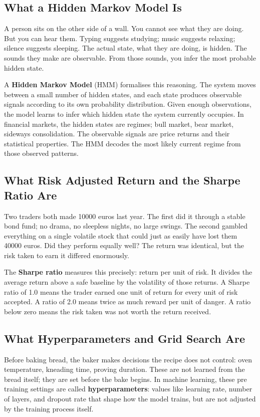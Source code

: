 \documentclass[journal]{IEEEtran}
\begin{document}
\subsection{What a Hidden Markov Model Is}

A person sits on the other side of a wall. You cannot see what they are
doing. But you can hear them. Typing suggests studying; music suggests
relaxing; silence suggests sleeping. The actual state, what they are
doing, is hidden. The sounds they make are observable. From those sounds,
you infer the most probable hidden state.

A \textbf{Hidden Markov Model} (HMM) formalises this reasoning. The
system moves between a small number of hidden states, and each state
produces observable signals according to its own probability
distribution. Given enough observations, the model learns to infer which
hidden state the system currently occupies. In financial markets, the
hidden states are regimes; bull market, bear market, sideways
consolidation. The observable signals are price returns and their
statistical properties. The HMM decodes the most likely current regime
from those observed patterns.

\subsection{What Risk Adjusted Return and the Sharpe Ratio Are}

Two traders both made 10000 euros last year. The first did it through a
stable bond fund; no drama, no sleepless nights, no large swings. The
second gambled everything on a single volatile stock that could just as
easily have lost them 40000 euros. Did they perform equally well? The
return was identical, but the risk taken to earn it differed enormously.

The \textbf{Sharpe ratio} measures this precisely: return per unit of
risk. It divides the average return above a safe baseline by the
volatility of those returns. A Sharpe ratio of 1.0 means the trader
earned one unit of return for every unit of risk accepted. A ratio of 2.0
means twice as much reward per unit of danger. A ratio below zero means
the risk taken was not worth the return received.

\subsection{What Hyperparameters and Grid Search Are}

Before baking bread, the baker makes decisions the recipe does not
control: oven temperature, kneading time, proving duration. These are not
learned from the bread itself; they are set before the bake begins. In
machine learning, these pre training settings are called
\textbf{hyperparameters}: values like learning rate, number of layers,
and dropout rate that shape how the model trains, but are not adjusted
by the training process itself.
\end{document}
